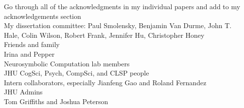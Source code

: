 
Go through all of the acknowledgments in my individual papers and add to my acknowledgements section\\
My dissertation committee: Paul Smolensky, Benjamin Van Durme, John T. Hale, Colin Wilson, Robert Frank, Jennifer Hu, Christopher Honey\\
Friends and family\\
Irina and Pepper\\
Neurosymbolic Computation lab members\\
JHU CogSci, Psych, CompSci, and CLSP people\\
Intern collaborators, especially Jianfeng Gao and Roland Fernandez\\
JHU Admins\\
Tom Griffiths and Joshua Peterson\\
